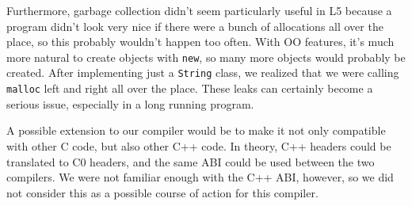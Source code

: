 \documentclass{article}
\begin{document}
Furthermore, garbage collection didn't seem particularly useful in L5 because
a program didn't look very nice if there were a bunch of allocations all over
the place, so this probably wouldn't happen too often. With OO features, it's
much more natural to create objects with \texttt{new}, so many more objects
would probably be created. After implementing just a \texttt{String} class, we
realized that we were calling \texttt{malloc} left and right all over the place.
These leaks can certainly become a serious issue, especially in a long running
program.

A possible extension to our compiler would be to make it not only compatible
with other C code, but also other C++ code. In theory, C++ headers could be
translated to C0 headers, and the same ABI could be used between the two
compilers. We were not familiar enough with the C++ ABI, however, so we did
not consider this as a possible course of action for this compiler.
\end{document}
